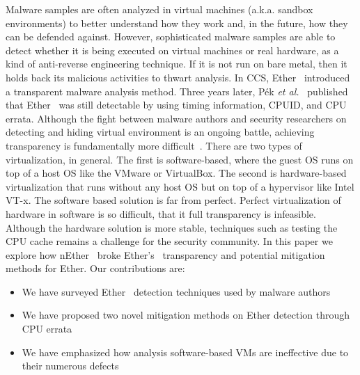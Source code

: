 Malware samples are often analyzed in virtual machines (a.k.a. sandbox
environments) to better understand how they work and, in the future, how they
can be defended against. However, sophisticated malware samples are able to
detect whether it is being executed on virtual machines or real hardware, as a
kind of anti-reverse engineering technique. If it is not run on bare metal, then
it holds back its malicious activities to thwart analysis. In
CCS, Ether~\cite{ether} introduced a transparent malware
analysis method. Three years later, P{\'e}k \textit{et al.}~\cite{nether}
published that Ether~\cite{ether} was still detectable by using timing
information, CPUID, and CPU errata. Although the fight between malware authors
and security researchers on detecting and hiding virtual environment is an
ongoing battle, achieving transparency is fundamentally more
difficult~\cite{garfinkel2007}. There are two types of virtualization, in
general. The first is software-based, where the guest OS runs on top of a host
OS like the VMware or VirtualBox. The second is hardware-based virtualization
that runs without any host OS but on top of a hypervisor like Intel VT-x. The
software based solution is far from perfect. Perfect virtualization of hardware
in software is so difficult, that it full transparency is infeasible. Although
the hardware solution is more stable, techniques such as testing the CPU cache
remains a challenge for the security community. In this paper we explore how
nEther~\cite{nether} broke Ether's~\cite{ether} transparency and potential
mitigation methods for Ether. Our contributions are:

\begin{itemize}
\item We have surveyed Ether~\cite{ether} detection techniques used by malware
  authors
\item We have proposed two novel mitigation methods on Ether detection through
  CPU errata
\item We have emphasized how analysis software-based VMs are ineffective due to
  their numerous defects
\end{itemize}

